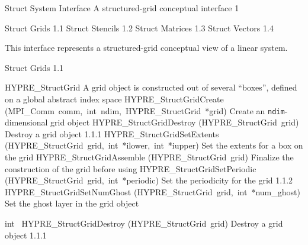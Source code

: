 \documentclass{article}
\begin{document}
\begin{cxxentry}
{}
        {Struct System Interface}
        {}
        {A structured-grid conceptual interface}
        {1}
\begin{cxxnames}
\cxxitem{}
        {Struct Grids}
        {}
        {
}
        {1.1}
\cxxitem{}
        {Struct Stencils}
        {}
        {
}
        {1.2}
\cxxitem{}
        {Struct Matrices}
        {}
        {
}
        {1.3}
\cxxitem{}
        {Struct Vectors}
        {}
        {
}
        {1.4}
\end{cxxnames}
\begin{cxxdoc}


This interface represents a structured-grid conceptual view of a linear
system.


\end{cxxdoc}
\begin{cxxentry}
{}
        {Struct Grids}
        {}
        {
}
        {1.1}
\begin{cxxnames}
        {HYPRE\_StructGrid}
        {}
        {
A grid object is constructed out of several ``boxes'', defined on a global
abstract index space}
        {}
\label{cxx.1.1.3}
        {HYPRE\_StructGridCreate}
        {(MPI\_Comm\ comm,\ int\ ndim,\ HYPRE\_StructGrid\ *grid)}
        {
Create an {\tt ndim}-dimensional grid object}
        {}
\label{cxx.1.1.4}
        {HYPRE\_StructGridDestroy}
        {(HYPRE\_StructGrid\ grid)}
        {
Destroy a grid object}
        {1.1.1}
        {HYPRE\_StructGridSetExtents}
        {(HYPRE\_StructGrid\ grid,\ int\ *ilower,\ int\ *iupper)}
        {
Set the extents for a box on the grid}
        {}
\label{cxx.1.1.5}
        {HYPRE\_StructGridAssemble}
        {(HYPRE\_StructGrid\ grid)}
        {
Finalize the construction of the grid before using}
        {}
\label{cxx.1.1.6}
        {HYPRE\_StructGridSetPeriodic}
        {(HYPRE\_StructGrid\ grid,\ int\ *periodic)}
        {
Set the periodicity for the grid}
        {1.1.2}
        {HYPRE\_StructGridSetNumGhost}
        {(HYPRE\_StructGrid\ grid,\ int\ *num\_ghost)}
        {
Set the ghost layer in the grid object}
        {}
\label{cxx.1.1.7}
\end{cxxnames}
\begin{cxxfunction}
{int\ }
        {HYPRE\_StructGridDestroy}
        {(HYPRE\_StructGrid\ grid)}
        {
Destroy a grid object}
        {1.1.1}
\begin{cxxdoc}


\end{cxxdoc}
\end{cxxfunction}
\end{cxxentry}
\end{cxxentry}
\end{document}
